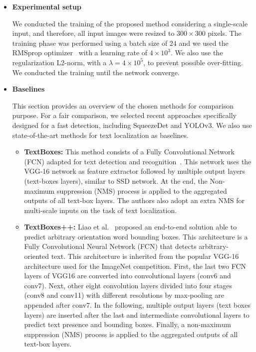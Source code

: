 \begin{itemize}
\item {\bf Experimental setup}

We conducted the training of the proposed method considering a single-scale input, and therefore, all input images were resized to $300 \times 300$ pixels. The training phase was performed using a batch size of $24$ and we used the RMSprop optimizer~\cite{Tieleman2012} with a learning rate of $4 \times 10^3$. We also use the regularization L2-norm, with a $\lambda=4 \times 10^5$, to prevent possible over-fitting. We conducted the training until the network converge.



\item{\bf Baselines}


This section provides an overview of the chosen methods for comparison purpose. For a fair comparison, we selected recent approaches specifically designed for a fast detection, including SqueezeDet and YOLOv3. We also use state-of-the-art methods for text localization as baselines.

\begin{itemize}
\item{\bf TextBoxes:} This method consists of a Fully Convolutional Network (FCN) adapted for text detection and recognition~\cite{Liao2017AAAI}. This network uses the VGG-16 network as feature extractor followed by multiple output layers (text-boxes layers), similar to SSD network. At the end, the Non-maximum suppression (NMS) process is applied to the aggregated outputs of all text-box layers. The authors also adopt an extra NMS for multi-scale inputs on the task of text localization.

\item{\bf TextBoxes++:} Liao et al.~\cite{Liao2018TIP} proposed an end-to-end solution able to predict arbitrary orientation word bounding boxes. This architecture is a Fully Convolutional Neural Network (FCN) that detects arbitrary-oriented text. This architecture is inherited from the  popular VGG-16  architecture used for the ImageNet competition. First, the last two FCN layers of VGG16 are converted into convolutional layers (conv6 and conv7). Next, other eight convolution layers divided into four stages (conv8 and conv11) with  different  resolutions  by  max-pooling  are  appended  after conv7. In the following, multiple output layers (text boxes layers) are inserted after the last and intermediate convolutional layers to predict text presence and bounding boxes. Finally, a non-maximum suppression (NMS) process is applied to the aggregated outputs of all text-box layers.


\end{itemize}
\end{itemize}
